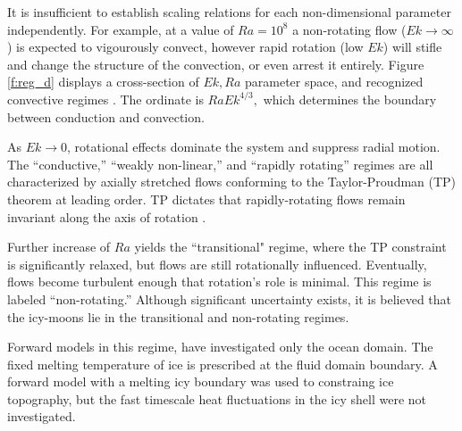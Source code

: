 \documentclass{article}
\begin{document}
It is insufficient to establish scaling relations for each non-dimensional parameter independently. 
For example, at a value of $Ra = 10^{8}$ a non-rotating flow ($Ek\rightarrow \infty$) is expected to vigourously convect, however rapid rotation (low  $Ek$) will stifle and change the structure of the convection, or even arrest it entirely\citep{sC61}. 
Figure \ref{f:reg_d} displays a cross-section of $Ek,Ra$ parameter space, and recognized convective regimes \citep{tG16}. The ordinate is $RaEk^{4/3},$ which determines the boundary between conduction and convection\citep{sC61}.

As $Ek\rightarrow 0$, rotational effects dominate the system and suppress radial motion. The ``conductive,'' ``weakly non-linear,'' and ``rapidly rotating'' regimes\citep{tG16,kJ12} are all characterized by axially stretched flows conforming to the Taylor-Proudman (TP) theorem at leading order. TP dictates that rapidly-rotating flows remain invariant along the axis of rotation \citep{gB53}.

Further increase of $Ra$ yields the ``transitional" regime, where the TP constraint is significantly relaxed, but flows are still rotationally influenced.
Eventually, flows become turbulent enough that rotation's role is minimal. This regime is labeled ``non-rotating.''
Although significant uncertainty exists, it is believed that the icy-moons lie in the transitional and non-rotating regimes\citep{dL23,tG16}.

Forward models in this regime\citep{kS19, dL23}, have investigated only the ocean domain. The fixed melting temperature of ice is prescribed at the fluid domain boundary.
A forward model with a melting icy boundary was used to constraing ice topography, but the fast timescale heat fluctuations in the icy shell were not investigated\citep{jK24}.
\end{document}

